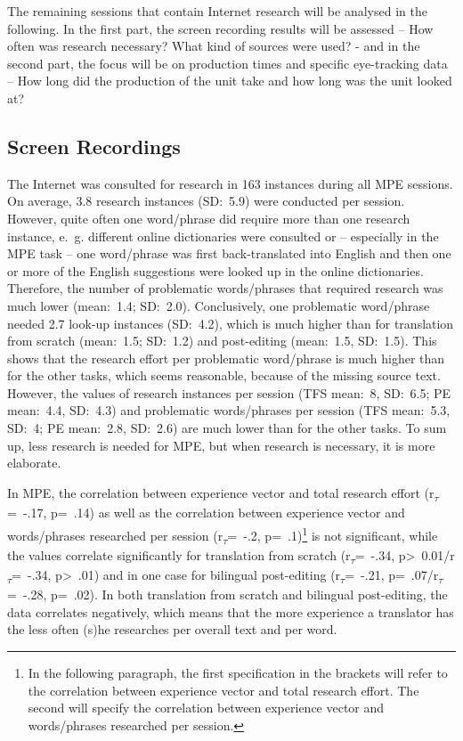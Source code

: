 \documentclass[output=paper]{langsci/langscibook}
\begin{document}
The remaining sessions that contain Internet research will be analysed in the following. In the first part, the screen recording results will be assessed – How often was research necessary? What kind of sources were used? - and in the second part, the focus will be on production times and specific eye-tracking data – How long did the production of the unit take and how long was the unit looked at?


\subsection{Screen Recordings}

The Internet was consulted for research in 163 instances during all MPE sessions. On average, 3.8 research instances (SD:~5.9) were conducted per session. However, quite often one word/phrase did require more than one research instance, e.~g. different online dictionaries were consulted or – especially in the MPE task – one word/phrase was first back-translated into English and then one or more of the English suggestions were looked up in the online dictionaries. Therefore, the number of problematic words/phrases that required research was much lower (mean:~1.4; SD:~2.0). Conclusively, one problematic word/phrase needed 2.7 look-up instances (SD:~4.2), which is much higher than for translation from scratch (mean:~1.5; SD:~1.2) and post-editing (mean:~1.5, SD:~1.5). This shows that the research effort per problematic word/phrase is much higher than for the other tasks, which seems reasonable, because of the missing source text. However, the values of research instances per session (TFS mean:~8, SD:~6.5; PE mean:~4.4, SD:~4.3) and problematic words/phrases per session (TFS mean:~5.3, SD:~4; PE mean:~2.8, SD:~2.6) are much lower than for the other tasks. To sum up, less research is needed for MPE, but when research is necessary, it is more elaborate.


In MPE, the correlation between experience vector and total research effort (r\textsubscript{$\tau $}=~-.17,\textsubscript{ }p=~.14) as well as the correlation between experience vector and words/phrases researched per session (r\textsubscript{$\tau $}=~-.2,\textsubscript{ }p=~.1)\footnote{In the following paragraph, the first specification in the brackets will refer to the correlation between experience vector and total research effort. The second will specify the correlation between experience vector and words/phrases researched per session.} is not significant, while the values correlate significantly for translation from scratch (r\textsubscript{$\tau $}=~-.34, p{\textgreater}~0.01/r\textsubscript{$\tau $}=~-.34, p{\textgreater}~.01) and in one case for bilingual post-editing (r\textsubscript{$\tau $}=~-.21, p=~.07/r\textsubscript{$\tau $}=~-.28, p=~.02). In both translation from scratch and bilingual post-editing, the data correlates negatively, which means that the more experience a translator has the less often (s)he researches per overall text and per word. 
\end{document}
